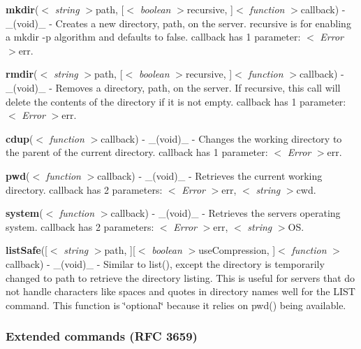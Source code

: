 \begin{DoxyItemize}
\item {\bfseries mkdir}($<$ {\itshape string} $>$path, \mbox{[}$<$ {\itshape boolean} $>$recursive, \mbox{]}$<$ {\itshape function} $>$callback) -\/ \+\_\+(void)\+\_\+ -\/ Creates a new directory, {\ttfamily path}, on the server. {\ttfamily recursive} is for enabling a \textquotesingle{}mkdir -\/p\textquotesingle{} algorithm and defaults to false. {\ttfamily callback} has 1 parameter\+: $<$ {\itshape Error} $>$err.
\item {\bfseries rmdir}($<$ {\itshape string} $>$path, \mbox{[}$<$ {\itshape boolean} $>$recursive, \mbox{]}$<$ {\itshape function} $>$callback) -\/ \+\_\+(void)\+\_\+ -\/ Removes a directory, {\ttfamily path}, on the server. If {\ttfamily recursive}, this call will delete the contents of the directory if it is not empty. {\ttfamily callback} has 1 parameter\+: $<$ {\itshape Error} $>$err.
\item {\bfseries cdup}($<$ {\itshape function} $>$callback) -\/ \+\_\+(void)\+\_\+ -\/ Changes the working directory to the parent of the current directory. {\ttfamily callback} has 1 parameter\+: $<$ {\itshape Error} $>$err.
\item {\bfseries pwd}($<$ {\itshape function} $>$callback) -\/ \+\_\+(void)\+\_\+ -\/ Retrieves the current working directory. {\ttfamily callback} has 2 parameters\+: $<$ {\itshape Error} $>$err, $<$ {\itshape string} $>$cwd.
\item {\bfseries system}($<$ {\itshape function} $>$callback) -\/ \+\_\+(void)\+\_\+ -\/ Retrieves the server\textquotesingle{}s operating system. {\ttfamily callback} has 2 parameters\+: $<$ {\itshape Error} $>$err, $<$ {\itshape string} $>$OS.
\item {\bfseries list\+Safe}(\mbox{[}$<$ {\itshape string} $>$path, \mbox{]}\mbox{[}$<$ {\itshape boolean} $>$use\+Compression, \mbox{]}$<$ {\itshape function} $>$callback) -\/ \+\_\+(void)\+\_\+ -\/ Similar to list(), except the directory is temporarily changed to {\ttfamily path} to retrieve the directory listing. This is useful for servers that do not handle characters like spaces and quotes in directory names well for the L\+I\+ST command. This function is \char`\"{}optional\char`\"{} because it relies on pwd() being available.
\end{DoxyItemize}

\subsubsection*{Extended commands (R\+FC 3659)}


